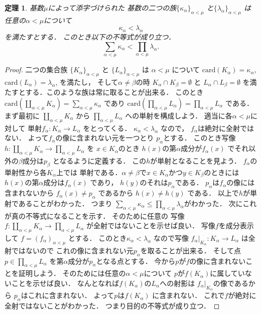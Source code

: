 \documentclass[leqno, a4paper, 12pt]{jsarticle}
\newtheorem{thm}{定理}
\newcommand{\card}{\mathrm{card}}
\begin{document}
\begin{thm}\label{thm:koniglemma}
基数$\mu$によって添字づけられた
基数の二つの族$\{\kappa_{\alpha}\}_{\alpha<\mu}$
と$\{\lambda_{\alpha}\}_{\alpha<\mu}$
は任意の$\alpha<\mu$について
\[
\kappa_{\alpha}< \lambda_{\alpha}
\]
を満たすとする．
このとき以下の不等式が成り立つ．
\[
\sum_{\alpha<\mu}\kappa_{\alpha}<\prod_{\alpha<\mu}\lambda_{\alpha}. 
\]
\end{thm}
\begin{proof}
二つの集合族
$\{K_{\alpha}\}_{\alpha<\mu}$
と
$\{L_{\alpha}\}_{\alpha<\mu}$
は
$\alpha<\mu$
について
$\card(K_{\alpha})=\kappa_{\alpha}$,
$\card(L_{\alpha})=\lambda_{\alpha}$, 
を満たし，
そして$\alpha\neq \beta$の時
$K_{\alpha}\cap K_{\beta}=\emptyset$
と
$L_{\alpha}\cap L_{\beta}=\emptyset$
を満たすとする．このような族は常に取ることが出来る．
このとき
$\card\left(\coprod_{\alpha<\mu}K_{\alpha}\right)=\sum_{\alpha<\mu}\kappa_{\alpha}$
であり
$\card\left(\prod_{\alpha<\mu}L_{\alpha}\right)=\prod_{\alpha<\mu}L_{\alpha}$
である．
まず最初に
$\coprod_{\alpha<\mu}K_{\alpha}$
から
$\prod_{\alpha<\mu}L_{\alpha}$
への単射を構成しよう．
適当に各$\alpha<\mu$に対して
単射$f_{\alpha}\colon K_{\alpha}\to L_{\alpha}$
をとってくる．
$\kappa_{\alpha}<\lambda_{\alpha}$
なので，
$f_{\alpha}$は絶対に全射ではない．
よって$f_{\alpha}$の像に含まれない元を一つとり
$p_{\alpha}$とする．
このとき写像
$h\colon \coprod_{\alpha<\mu}K_{\alpha}\to \prod_{\alpha<\mu}L_{\alpha}$
を
$x\in K_{\alpha}$のとき
$h(x)$の第$\alpha$成分が$f_{\alpha}(x)$
でそれ以外の$\beta$成分は$p_{\beta}$
となるように定義する．
この$h$が単射となることを見よう．
$f_{\alpha}$の単射性から各$K_{\alpha}$上では
単射である．$\alpha\neq \beta$で$x\in K_{\alpha}$かつ$y\in K_{\beta}$のときには
$h(x)$の第$\alpha$成分は$f_{\alpha}(x)$
であり，
$h(y)$のそれは$p_{\alpha}$である．
$p_{\alpha}$は$f_{\alpha}$の像には含まれないから
$f_{\alpha}(x)\neq p_{\alpha}$
であるから
$h(x)\neq h(y)$
である．
以上で$h$が単射であることがわかった．
つまり
$\sum_{\alpha<\mu}\kappa_{\alpha}\le \prod_{\alpha<\mu}\lambda_{\alpha}
$がわかった．
次にこれが真の不等式になることを示す．
そのために任意の
写像$f\colon \coprod_{\alpha<\mu}K_{\alpha}\to \prod_{\alpha<\mu}L_{\alpha}$
が全射ではないことを示せば良い．
写像$f$を成分表示して
$f=(f_{\alpha})_{\alpha<\mu}$
とする．
このとき$\kappa_{\alpha}<\lambda_{\alpha}$
なので写像
$f_{\alpha}|_{K_{\alpha}}\colon K_{\alpha}\to L_{\alpha}$
は全射ではないので
これの像に含まれない元$p_{\alpha}$を取ることが出来る．
そして点$p\in \prod_{\alpha<\mu}L_{\alpha}$
を第$\alpha$成分が$p_{\alpha}$となる点とする．
今から$p$が$f$の像に含まれないことを証明しよう．
そのためには任意の$\alpha<\mu$について
$p$が$f(K_{\alpha})$に属していないことを示せば良い．
なんとなれば$f(K_{\alpha})$の$L_{\alpha}$への射影は
$f_{\alpha}|_{K_{\alpha}}$の像であるから
$p_{\alpha}$はこれに含まれない．
よって$p$は$f(K_{\alpha})$
に含まれない．
これで$f$が絶対に全射ではないことがわかった．
つまり目的の不等式が成り立つ．
\end{proof}
\end{document}
